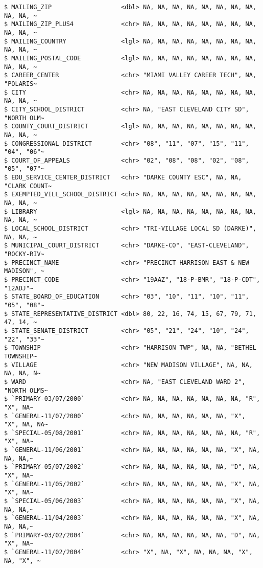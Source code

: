 \documentclass[
  letterpaper,
  DIV=11,
  numbers=noendperiod]{scrartcl}
\begin{document}
\begin{verbatim}
$ MAILING_ZIP                   <dbl> NA, NA, NA, NA, NA, NA, NA, NA, NA, NA, ~
$ MAILING_ZIP_PLUS4             <chr> NA, NA, NA, NA, NA, NA, NA, NA, NA, NA, ~
$ MAILING_COUNTRY               <lgl> NA, NA, NA, NA, NA, NA, NA, NA, NA, NA, ~
$ MAILING_POSTAL_CODE           <lgl> NA, NA, NA, NA, NA, NA, NA, NA, NA, NA, ~
$ CAREER_CENTER                 <chr> "MIAMI VALLEY CAREER TECH", NA, "POLARIS~
$ CITY                          <chr> NA, NA, NA, NA, NA, NA, NA, NA, NA, NA, ~
$ CITY_SCHOOL_DISTRICT          <chr> NA, "EAST CLEVELAND CITY SD", "NORTH OLM~
$ COUNTY_COURT_DISTRICT         <lgl> NA, NA, NA, NA, NA, NA, NA, NA, NA, NA, ~
$ CONGRESSIONAL_DISTRICT        <chr> "08", "11", "07", "15", "11", "04", "06"~
$ COURT_OF_APPEALS              <chr> "02", "08", "08", "02", "08", "05", "07"~
$ EDU_SERVICE_CENTER_DISTRICT   <chr> "DARKE COUNTY ESC", NA, NA, "CLARK COUNT~
$ EXEMPTED_VILL_SCHOOL_DISTRICT <chr> NA, NA, NA, NA, NA, NA, NA, NA, NA, NA, ~
$ LIBRARY                       <lgl> NA, NA, NA, NA, NA, NA, NA, NA, NA, NA, ~
$ LOCAL_SCHOOL_DISTRICT         <chr> "TRI-VILLAGE LOCAL SD (DARKE)", NA, NA, ~
$ MUNICIPAL_COURT_DISTRICT      <chr> "DARKE-CO", "EAST-CLEVELAND", "ROCKY-RIV~
$ PRECINCT_NAME                 <chr> "PRECINCT HARRISON EAST & NEW MADISON", ~
$ PRECINCT_CODE                 <chr> "19AAZ", "18-P-BMR", "18-P-CDT", "12ADJ"~
$ STATE_BOARD_OF_EDUCATION      <chr> "03", "10", "11", "10", "11", "05", "08"~
$ STATE_REPRESENTATIVE_DISTRICT <dbl> 80, 22, 16, 74, 15, 67, 79, 71, 47, 14, ~
$ STATE_SENATE_DISTRICT         <chr> "05", "21", "24", "10", "24", "22", "33"~
$ TOWNSHIP                      <chr> "HARRISON TWP", NA, NA, "BETHEL TOWNSHIP~
$ VILLAGE                       <chr> "NEW MADISON VILLAGE", NA, NA, NA, NA, N~
$ WARD                          <chr> NA, "EAST CLEVELAND WARD 2", "NORTH OLMS~
$ `PRIMARY-03/07/2000`          <chr> NA, NA, NA, NA, NA, NA, NA, "R", "X", NA~
$ `GENERAL-11/07/2000`          <chr> NA, NA, NA, NA, NA, NA, "X", "X", NA, NA~
$ `SPECIAL-05/08/2001`          <chr> NA, NA, NA, NA, NA, NA, NA, "R", "X", NA~
$ `GENERAL-11/06/2001`          <chr> NA, NA, NA, NA, NA, NA, "X", NA, NA, NA,~
$ `PRIMARY-05/07/2002`          <chr> NA, NA, NA, NA, NA, NA, "D", NA, "X", NA~
$ `GENERAL-11/05/2002`          <chr> NA, NA, NA, NA, NA, NA, "X", NA, "X", NA~
$ `SPECIAL-05/06/2003`          <chr> NA, NA, NA, NA, NA, NA, "X", NA, NA, NA,~
$ `GENERAL-11/04/2003`          <chr> NA, NA, NA, NA, NA, NA, "X", NA, NA, NA,~
$ `PRIMARY-03/02/2004`          <chr> NA, NA, NA, NA, NA, NA, "D", NA, "X", NA~
$ `GENERAL-11/02/2004`          <chr> "X", NA, "X", NA, NA, NA, "X", NA, "X", ~

\end{verbatim}
\end{document}
